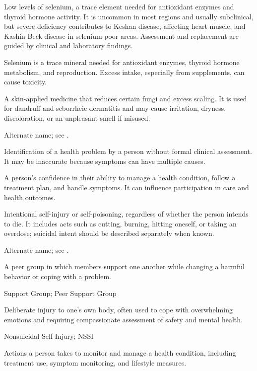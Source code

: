  Low levels of selenium, a trace element needed for
antioxidant enzymes and thyroid hormone activity. It is uncommon in most regions and
usually subclinical, but severe deficiency contributes to Keshan disease, affecting heart
muscle, and Kashin-Beck disease in selenium-poor areas. Assessment and replacement are
guided by clinical and laboratory findings.

 Selenium is a trace mineral needed for antioxidant enzymes, thyroid hormone metabolism, and reproduction. Excess intake, especially from supplements, can cause toxicity.

 A skin-applied medicine that reduces certain fungi and excess scaling. It is used for dandruff and seborrheic dermatitis and may cause irritation, dryness, discoloration, or an unpleasant smell if misused.

 Alternate name; see .

 Identification of a health problem by a person without formal clinical assessment. It may be inaccurate because symptoms can have multiple causes.

 A person's confidence in their ability to manage a health condition, follow a treatment plan, and handle symptoms. It can influence participation in care and health outcomes.

 Intentional self-injury or self-poisoning, regardless of whether the person intends to die. It includes acts such as cutting, burning, hitting oneself, or taking an overdose; suicidal intent should be described separately when known.

 Alternate name; see .

 A peer group in which members support one another while changing a harmful behavior or coping with a problem.

\synonyms
Support Group; Peer Support Group

 Deliberate injury to one's own body, often used to cope with overwhelming emotions and requiring compassionate assessment of safety and mental health.

\synonyms
Nonsuicidal Self-Injury; NSSI

 Actions a person takes to monitor and manage a health condition, including treatment use, symptom monitoring, and lifestyle measures.

